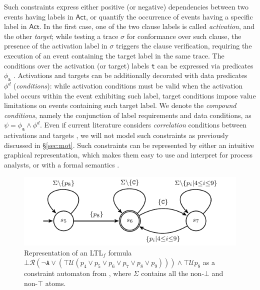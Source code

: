  Such constraints express either positive (or negative) dependencies between two events having labels in $\textsf{Act}$, or quantify the occurrence of events having a specific label in $\textsf{Act}$. In the first case, one of the two clause labels is called \textit{activation}, and the other \textit{target}; while testing a trace $\sigma$ for conformance over such clause, the presence of the activation label in $\sigma$ triggers the clause verification, requiring the execution of an event containing the target label in the same trace. The conditions over the activation (or target) labels \texttt{t} can be expressed via predicates $\phi_{\texttt{a}}$ \cite{SchonigCMM16,LenoDM18}. Activations and targets can be additionally decorated with  data predicates $\phi^d$ (\textit{conditions}): while activation conditions must be valid when the activation label occurs within the event exhibiting such label, target conditions impose value limitations on events containing such target label. We denote the \textit{compound conditions}, namely the conjunction of label requirements and data conditions, as $\psi=\phi_{\texttt{a}}\wedge \phi^d$.  Even if current literature  considers \textit{correlation} conditions between activations and targets \cite{SchonigCMM16}, we will not model such constraints as previously discussed in \S\ref{sec:mot}. Such constraints can be represented by either an intuitive graphical representation, which makes them easy to use and interpret for process analysts, or with a formal semantics \cite{LeoniMA12}.

\begin{figure}[!t]
	\centering
%
\includegraphics[scale=0.9]{images/example_3_graph}
	\caption{Representation of an LTL$_f$ formula $\bot\mathcal{R}(\neg\texttt{A}\vee(\top\mathcal{U}(p_4\vee p_5\vee p_6\vee p_7\vee p_8\vee p_9)))\wedge\top\mathcal{U} p_8$  as a constraint automaton from \cite{LeoniMA12,Westergaard11}, where $\Sigma$ contains all the non-$\bot$ and non-$\top$ atoms.}
	\label{fig:g1g2}
\end{figure}

